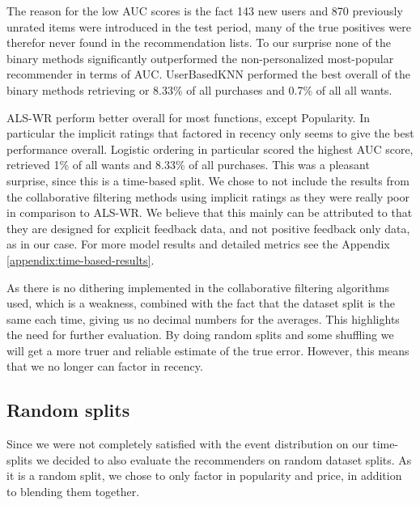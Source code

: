 The reason for the low AUC scores is the fact 143 new users and 870 previously unrated items were introduced in the test period, many of the true positives
were therefor never found in the recommendation lists. To our surprise none of the binary methods significantly outperformed the
non-personalized most-popular recommender in terms of AUC. UserBasedKNN performed the best overall of the binary methods retrieving or 8.33\% of all purchases
and 0.7\% of all all wants.   

ALS-WR perform better overall for most functions, except Popularity. In particular the implicit ratings that factored in recency only seems
to give the best performance overall. Logistic ordering in particular scored the highest AUC score, retrieved 1\% of all wants and 8.33\% of all purchases.
This was a pleasant surprise, since this is a time-based split. We chose to not include the results from the collaborative filtering methods using implicit
ratings as they were really poor in comparison to ALS-WR. We believe that this mainly can be attributed to that they are designed for explicit feedback data,
and not positive feedback only data, as in our case. For more model results and detailed metrics see the Appendix \ref{appendix:time-based-results}.

As there is no dithering implemented in the collaborative filtering algorithms used, which is a weakness, combined with the fact that the dataset split is the same
each time, giving us no decimal numbers for the averages. This highlights the need for further evaluation. By doing random splits and some shuffling we will get a more
truer and reliable estimate of the true error. However, this means that we no longer can factor in recency.

\subsection{Random splits}

Since we were not completely satisfied with the event distribution on our time-splits we decided to also evaluate the recommenders on random dataset splits.
As it is a random split, we chose to only factor in popularity and price, in addition to blending them together. 

